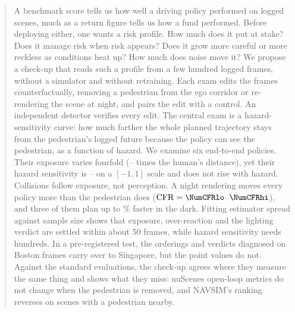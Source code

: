 \begin{abstract}
A benchmark score tells us how well a driving policy performed on logged scenes, much as a return
figure tells us how a fund performed. Before deploying either, one wants a risk profile. How much does
it put at stake? Does it manage risk when risk appears? Does it grow more careful or more reckless as
conditions heat up? How much does noise move it? We propose a check-up that reads such a profile from
a few hundred logged frames, without a simulator and without retraining. Each exam edits the frames
counterfactually, removing a pedestrian from the ego corridor or re-rendering the scene at night, and
pairs the edit with a control. An independent detector verifies every edit. The central exam is a
hazard-sensitivity curve: how much farther the whole planned trajectory stays from the pedestrian's
logged future because the policy can see the pedestrian, as a function of hazard. We examine six
end-to-end policies. Their exposure varies fourfold (\NumExpLo--\NumExpHi{} times the human's
distance), yet their hazard sensitivity is \NumHSlo--\NumHShi{} on a $[-1,1]$ scale and does not rise
with hazard. Collisions follow exposure, not perception. A night rendering moves every policy more
than the pedestrian does ($\CFR=\NumCFRlo$--$\NumCFRhi$), and three of them plan up to
\NumNightDD\% faster in the dark. Fitting estimator spread against sample
size shows that exposure, over-reaction and the lighting verdict are settled within about 50 frames,
while hazard sensitivity needs hundreds. In a pre-registered test, the orderings and verdicts
diagnosed on Boston frames carry over to Singapore, but the point values do not. Against the standard
evaluations, the check-up agrees where they measure the same thing and shows what they miss: nuScenes
open-loop metrics do not change when the pedestrian is removed, and NAVSIM's ranking reverses on
scenes with a pedestrian nearby.
\end{abstract}
